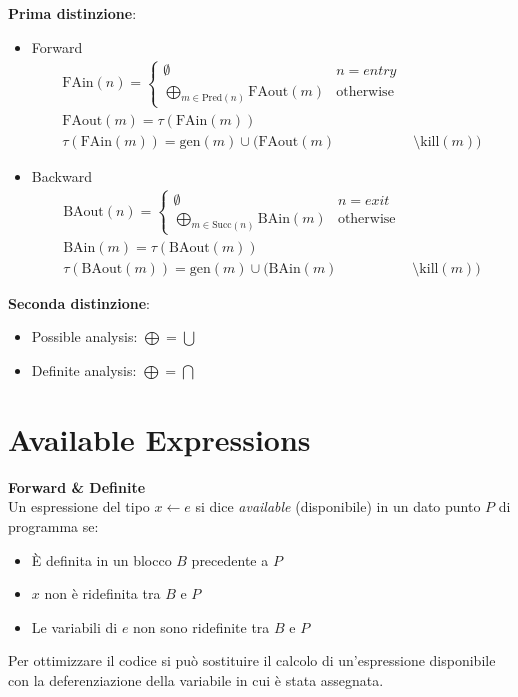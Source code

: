 \documentclass[a4paper,12pt,openany]{article}
\begin{document}
    \newpage    
    \textbf{Prima distinzione}:
    \begin{itemize}
        \item Forward
        \begin{align*}
            \mbox{FAin}(n) = 
            \begin{cases}
                \emptyset & n=entry\\
                \bigoplus\limits_{m\in \mbox{Pred}(n)} \mbox{FAout}(m) & \mbox{otherwise}
            \end{cases}&\\[1em]
            \mbox{FAout}(m) = \tau(\mbox{FAin}(m))&\\
            \tau(\mbox{FAin}(m)) = \mbox{gen}(m) \cup (\mbox{FAout}(m) &\setminus \mbox{kill}(m))
        \end{align*}
        \item Backward
        \begin{align*}
            \mbox{BAout}(n) =
            \begin{cases}
                \emptyset & n=exit\\
                \bigoplus\limits_{m\in \mbox{Succ}(n)} \mbox{BAin}(m) & \mbox{otherwise}
            \end{cases}&\\[1em]
            \mbox{BAin}(m) = \tau(\mbox{BAout}(m))&\\
            \tau(\mbox{BAout}(m)) = \mbox{gen}(m) \cup (\mbox{BAin}(m) &\setminus \mbox{kill}(m))
        \end{align*}
    \end{itemize}

    \textbf{Seconda distinzione}:
    \begin{itemize}
        \item Possible analysis: $\bigoplus = \bigcup$
        \item Definite analysis: $\bigoplus = \bigcap$
    \end{itemize}
    
    \clearpage\section*{Available Expressions}
    \textbf{Forward \& Definite}\\[1em]
    Un espressione del tipo $x\leftarrow e$ si dice \emph{available} (disponibile) in un dato punto $P$ di programma se:
    \begin{itemize}[noitemsep, topsep=0.3em]
        \item È definita in un blocco $B$ precedente a $P$
        \item $x$ non è ridefinita tra $B$ e $P$
        \item Le variabili di $e$ non sono ridefinite tra $B$ e $P$
    \end{itemize}
    Per ottimizzare il codice si può sostituire il calcolo di un'espressione disponibile con la deferenziazione della variabile in cui è stata assegnata.\\[1em]
    
\end{document}
